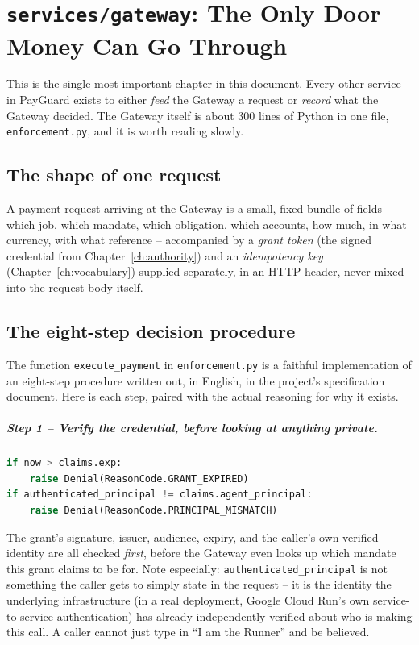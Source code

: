 \documentclass[11pt]{report}
\newcommand{\file}[1]{\texttt{#1}}
\newcommand{\code}[1]{\texttt{#1}}
\begin{document}
\chapter{\file{services/gateway}: The Only Door Money Can Go Through}
\label{ch:gateway}

This is the single most important chapter in this document. Every other
service in PayGuard exists to either \emph{feed} the Gateway a request or
\emph{record} what the Gateway decided. The Gateway itself is about 300
lines of Python in one file, \file{enforcement.py}, and it is worth
reading slowly.

\section{The shape of one request}

A payment request arriving at the Gateway is a small, fixed bundle of
fields -- which job, which mandate, which obligation, which accounts,
how much, in what currency, with what reference -- accompanied by a
\emph{grant token} (the signed credential from Chapter~\ref{ch:authority})
and an \emph{idempotency key} (Chapter~\ref{ch:vocabulary}) supplied
separately, in an HTTP header, never mixed into the request body itself.

\section{The eight-step decision procedure}

The function \code{execute\_payment} in \file{enforcement.py} is a
faithful implementation of an eight-step procedure written out, in
English, in the project's specification document. Here is each step,
paired with the actual reasoning for why it exists.

\paragraph{Step 1 -- Verify the credential, before looking at anything private.}

\begin{lstlisting}[language=Python]
if now > claims.exp:
    raise Denial(ReasonCode.GRANT_EXPIRED)
if authenticated_principal != claims.agent_principal:
    raise Denial(ReasonCode.PRINCIPAL_MISMATCH)
\end{lstlisting}

The grant's signature, issuer, audience, expiry, and the caller's own
verified identity are all checked \emph{first}, before the Gateway even
looks up which mandate this grant claims to be for. Note especially:
\code{authenticated\_principal} is not something the caller gets to
simply state in the request -- it is the identity the underlying
infrastructure (in a real deployment, Google Cloud Run's own
service-to-service authentication) has already independently verified
about who is making this call. A caller cannot just type in
``I am the Runner'' and be believed.
\end{document}
